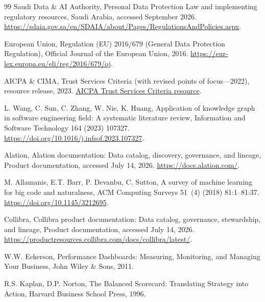 \documentclass[a4paper,fleqn]{cas-dc}
\begin{document}
\begin{thebibliography}{99}
Saudi Data \& AI Authority,
\newblock Personal Data Protection Law and implementing regulatory resources,
\newblock Saudi Arabia, accessed September 2026.
\newblock \url{https://sdaia.gov.sa/en/SDAIA/about/Pages/RegulationsAndPolicies.aspx}.

European Union,
\newblock Regulation (EU) 2016/679 (General Data Protection Regulation),
\newblock Official Journal of the European Union, 2016.
\newblock \url{https://eur-lex.europa.eu/eli/reg/2016/679/oj}.

AICPA \& CIMA,
 Trust Services Criteria (with revised points of focus---2022),
\newblock resource release, 2023.
\newblock \href{https://www.aicpa-cima.com/resources/download/2017-trust-services-criteria-with-revised-points-of-focus-2022}{AICPA Trust Services Criteria resource}.

L. Wang, C. Sun, C. Zhang, W. Nie, K. Huang,
\newblock Application of knowledge graph in software engineering field: A systematic literature review,
\newblock Information and Software Technology 164 (2023) 107327.
\newblock \url{https://doi.org/10.1016/j.infsof.2023.107327}.

Alation,
\newblock Alation documentation: Data catalog, discovery, governance, and lineage,
\newblock Product documentation, accessed July 14, 2026.
\newblock \url{https://docs.alation.com/}.

M. Allamanis, E.T. Barr, P. Devanbu, C. Sutton,
\newblock A survey of machine learning for big code and naturalness,
\newblock ACM Computing Surveys 51~(4) (2018) 81:1--81:37.
\newblock \url{https://doi.org/10.1145/3212695}.

Collibra,
\newblock Collibra product documentation: Data catalog, governance, stewardship, and lineage,
\newblock Product documentation, accessed July 14, 2026.
\newblock \url{https://productresources.collibra.com/docs/collibra/latest/}.

W.W. Eckerson,
\newblock Performance Dashboards: Measuring, Monitoring, and Managing Your Business,
\newblock John Wiley \& Sons, 2011.

R.S. Kaplan, D.P. Norton,
\newblock The Balanced Scorecard: Translating Strategy into Action,
\newblock Harvard Business School Press, 1996.


\end{thebibliography}
\end{document}
